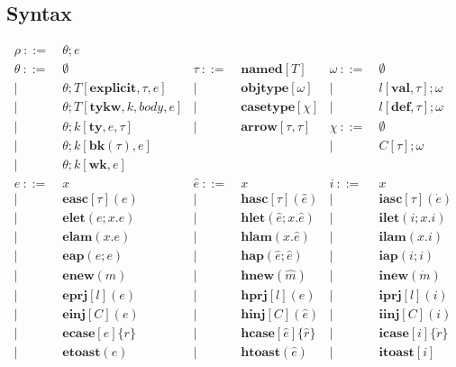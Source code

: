 \documentclass[letterpaper, notitlepage]{article}
\begin{document}
\subsection{Syntax}
\[
\begin{array}{rlrlrl}
	\rho		~::=&~ \theta;e\\				
	\theta		~::=&~ \emptyset								&\tau 		~::=&~ \mathbf{named}[T]	& \omega 		~::=&~ 	\emptyset\\
				| ~	&~ \theta; T[\mathbf{explicit}, \tau, e]	&|~	& ~ \mathbf{objtype}[\omega]		& |~&  	~l[\mathbf{val}, \tau];\omega\\
				| ~	&~ \theta; T[\mathbf{tykw}, k, body, e]		&|~	& ~ \mathbf{casetype}[\chi]			& |~&	~l[\mathbf{def}, \tau];\omega\\
				| ~	&~ \theta;k[\mathbf{ty},e,\tau]				&|~ & ~ \mathbf{arrow}[\tau, \tau]		& \chi 			~::=&~	\emptyset ~ \\
				| ~ &~ \theta;k[\mathbf{bk}(\tau),e]			&	&									& |~&	~C[\tau];\omega\\
				| ~ &~ \theta;k[\mathbf{wk},e]\\
	e 			~::=&~ x 								&\hat{e}	~::=&~ 	x 										& i 		~::=&~ 	x\\
				| ~ &~ \mathbf{easc}[\tau](e)			& 		 	| ~ &~ 	\mathbf{hasc}[\tau](\hat{e})			& 		 	| ~ &~	\mathbf{iasc}[\tau](\dot{e})\\
				| ~ &~ \mathbf{elet}(e; x.e)     		& 		 	| ~ &~ 	\mathbf{hlet}(\hat{e}; x.\hat{e})		& 		 	| ~ &~	\mathbf{ilet}(i;x.i)\\
				| ~ &~ \mathbf{elam}(x.e)     			& 		 	| ~ &~ 	\mathbf{hlam}(x.\hat{e})				& 		 	| ~ &~	\mathbf{ilam}(x.i)\\
				| ~ &~ \mathbf{eap}(e;e)     			& 		 	| ~ &~ 	\mathbf{hap}(\hat{e};\hat{e})			& 		 	| ~ &~	\mathbf{iap}(i;i)\\
				| ~ &~ \mathbf{enew}(m)     			& 		 	| ~ &~	\mathbf{hnew}(\hat{m})					& 		 	| ~ &~	\mathbf{inew}(\dot{m})\\
				| ~ &~ \mathbf{eprj}[l](e)     			& 		 	| ~ &~	\mathbf{hprj}[l](\hat{e})				& 		 	| ~ &~	\mathbf{iprj}[l](i)\\
				| ~ &~ \mathbf{einj}[C](e)     			& 		 	| ~ &~	\mathbf{hinj}[C](\hat{e})				& 		 	| ~ &~	\mathbf{iinj}[C](i)\\
				| ~ &~ \mathbf{ecase}[e]\{r\}     		& 		 	| ~ &~	\mathbf{hcase}[\hat{e}]\{\hat{r}\}		& 		 	| ~ &~	\mathbf{icase}[i]\{\dot{r}\}\\
				| ~ &~ \mathbf{etoast}(e)     			& 		 	| ~ &~	\mathbf{htoast}(\hat{e})				& 		 	| ~ &~	\mathbf{itoast}[i]\\

\end{array}\]
\end{document}
